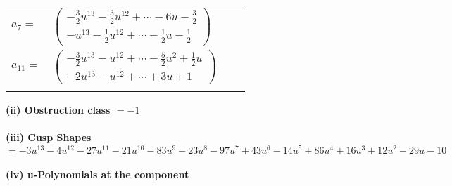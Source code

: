 \documentclass[1p]{elsarticle_modified}
\theoremstyle{definition}
\begin{document}
\begin{tabular}{m{7pt} m{180pt} m{7pt} m{180pt} }
\flushright $a_{7}=$&$\begin{pmatrix}-\frac{3}{2} u^{13}-\frac{3}{2} u^{12}+\cdots-6 u-\frac{3}{2}\\- u^{13}-\frac{1}{2} u^{12}+\cdots-\frac{1}{2} u-\frac{1}{2}\end{pmatrix}$ \\
\flushright $a_{11}=$&$\begin{pmatrix}-\frac{3}{2} u^{13}- u^{12}+\cdots-\frac{5}{2} u^2+\frac{1}{2} u\\-2 u^{13}- u^{12}+\cdots+3 u+1\end{pmatrix}$\\&\end{tabular}
\flushleft \textbf{(ii) Obstruction class $= -1$}\\~\\
\flushleft \textbf{(iii) Cusp Shapes $= -3 u^{13}-4 u^{12}-27 u^{11}-21 u^{10}-83 u^9-23 u^8-97 u^7+43 u^6-14 u^5+86 u^4+16 u^3+12 u^2-29 u-10$}\\~\\
\newpage\renewcommand{\arraystretch}{1}
\flushleft \textbf{(iv) u-Polynomials at the component}\newline \\
\end{document}
